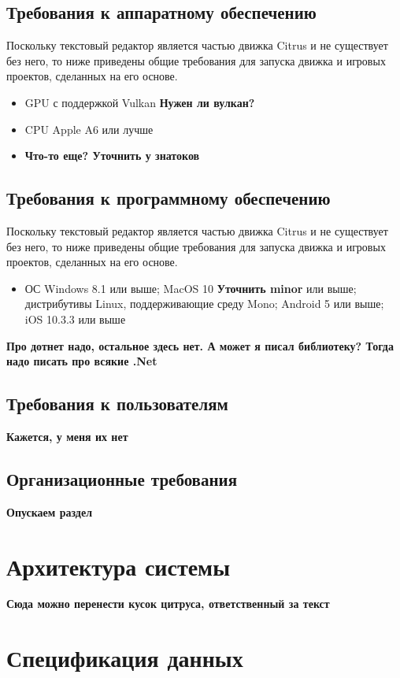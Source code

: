 \documentclass{fefu}
\begin{document}
		\subsection{Требования к аппаратному обеспечению}
			\par Поскольку текстовый редактор является частью движка Citrus и не существует 
			без него, то ниже приведены общие требования для запуска движка и игровых проектов,
			сделанных на его основе.
			\begin{itemize}
				\item GPU с поддержкой Vulkan \textbf{Нужен ли вулкан?}
				\item CPU Apple A6  или лучше
				\item \textbf{Что-то еще? Уточнить у знатоков}
			\end{itemize}
		\subsection{Требования к программному обеспечению}
			\par Поскольку текстовый редактор является частью движка Citrus и не существует 
			без него, то ниже приведены общие требования для запуска движка и игровых проектов,
			сделанных на его основе.
			\begin{itemize}
				\item ОС Windows 8.1 или выше; MacOS 10 \textbf{Уточнить minor} или выше; дистрибутивы 
				Linux, поддерживающие среду Mono; Android 5 или выше; iOS 10.3.3 или выше
			\end{itemize}
			\textbf{Про дотнет надо, остальное здесь нет. А может я писал библиотеку? Тогда надо писать про всякие .Net}
		\subsection{Требования к пользователям}
			\textbf{Кажется, у меня их нет}
		\subsection{Организационные требования}
			\textbf{Опускаем раздел}
	\section{Архитектура системы}
		\par \textbf{Сюда можно перенести кусок цитруса, ответственный за текст}
	\section{Спецификация данных}
\end{document}
